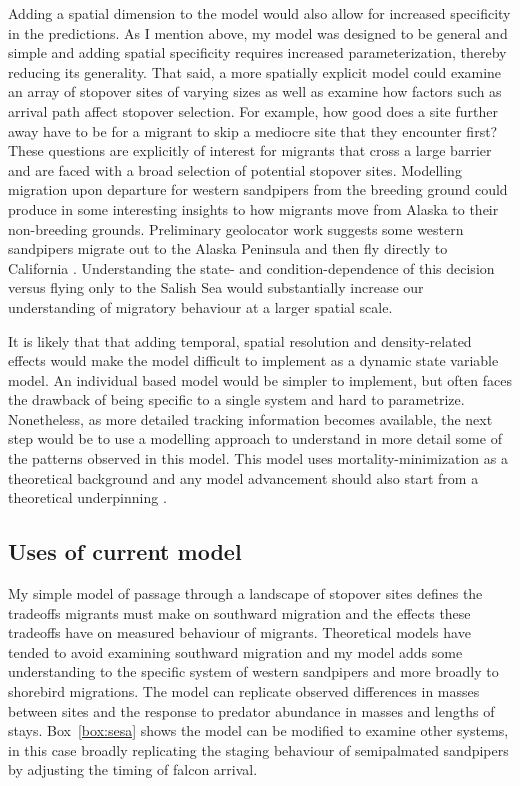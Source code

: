 Adding a spatial dimension to the model would also allow for increased specificity in the predictions. As I mention above, my model was designed to be general and simple and adding spatial specificity requires increased parameterization, thereby reducing its generality. That said, a more spatially explicit model could examine an array of stopover sites of varying sizes as well as examine how factors such as arrival path affect stopover selection. For example, how good does a site further away have to be for a migrant to skip a mediocre site that they encounter first? These questions are explicitly of interest for migrants that cross a large barrier and are faced with a broad selection of potential stopover sites. Modelling migration upon departure for western sandpipers from the breeding ground could produce in some interesting insights to how migrants move from Alaska to their non-breeding grounds. Preliminary geolocator work suggests some western sandpipers migrate out to the Alaska Peninsula and then fly directly to California \citep{north2016state}. Understanding the state- and condition-dependence of this decision versus flying only to the Salish Sea would substantially increase our understanding of migratory behaviour at a larger spatial scale.

It is likely that that adding temporal, spatial resolution and density-related effects would make the model difficult to implement as a dynamic state variable model. An individual based model would be simpler to implement, but often faces the drawback of being specific to a single system and hard to parametrize. Nonetheless, as more detailed tracking information becomes available, the next step would be to use a modelling approach to understand in more detail some of the patterns observed in this model. This model uses mortality-minimization as a theoretical background and any model advancement should also start from a theoretical underpinning \citep{GrimmVolkerandRailsback2005}.

\subsection*{Uses of current model}


My simple model of passage through a landscape of stopover sites defines the tradeoffs migrants must make on southward migration and the effects these tradeoffs have on measured behaviour of migrants. Theoretical models have tended to avoid examining southward migration and my model adds some understanding to the specific system of western sandpipers and more broadly to shorebird migrations. The model can replicate observed differences in masses between sites and the response to predator abundance in masses and lengths of stays.  Box~\ref{box:sesa} shows the model can be modified to examine other systems, in this case broadly replicating the staging behaviour of semipalmated sandpipers by adjusting the timing of falcon arrival.

